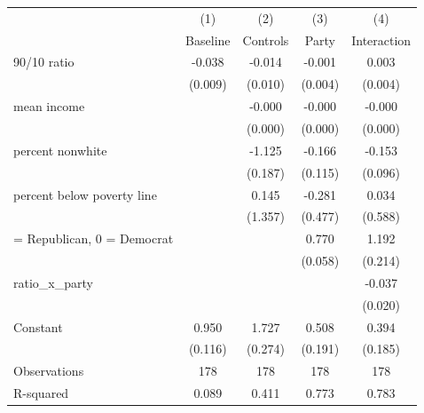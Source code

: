 \begin{tabular}{lcccc}
\toprule
                    &\multicolumn{1}{c}{(1)}&\multicolumn{1}{c}{(2)}&\multicolumn{1}{c}{(3)}&\multicolumn{1}{c}{(4)}\\
                    &\multicolumn{1}{c}{Baseline}&\multicolumn{1}{c}{Controls}&\multicolumn{1}{c}{Party}&\multicolumn{1}{c}{Interaction}\\
\midrule
90/10 ratio         &      -0.038\sym{***}&      -0.014         &      -0.001         &       0.003         \\
                    &     (0.009)         &     (0.010)         &     (0.004)         &     (0.004)         \\
\addlinespace
mean income         &                     &      -0.000\sym{***}&      -0.000\sym{**} &      -0.000\sym{**} \\
                    &                     &     (0.000)         &     (0.000)         &     (0.000)         \\
\addlinespace
percent nonwhite    &                     &      -1.125\sym{***}&      -0.166         &      -0.153         \\
                    &                     &     (0.187)         &     (0.115)         &     (0.096)         \\
\addlinespace
percent below poverty line&                     &       0.145         &      -0.281         &       0.034         \\
                    &                     &     (1.357)         &     (0.477)         &     (0.588)         \\
\addlinespace
1 = Republican, 0 = Democrat&                     &                     &       0.770\sym{***}&       1.192\sym{***}\\
                    &                     &                     &     (0.058)         &     (0.214)         \\
\addlinespace
ratio\_x\_party       &                     &                     &                     &      -0.037\sym{*}  \\
                    &                     &                     &                     &     (0.020)         \\
\addlinespace
Constant            &       0.950\sym{***}&       1.727\sym{***}&       0.508\sym{***}&       0.394\sym{**} \\
                    &     (0.116)         &     (0.274)         &     (0.191)         &     (0.185)         \\
\midrule
Observations        &         178         &         178         &         178         &         178         \\
R-squared           &       0.089         &       0.411         &       0.773         &       0.783         \\
\bottomrule
\end{tabular}
